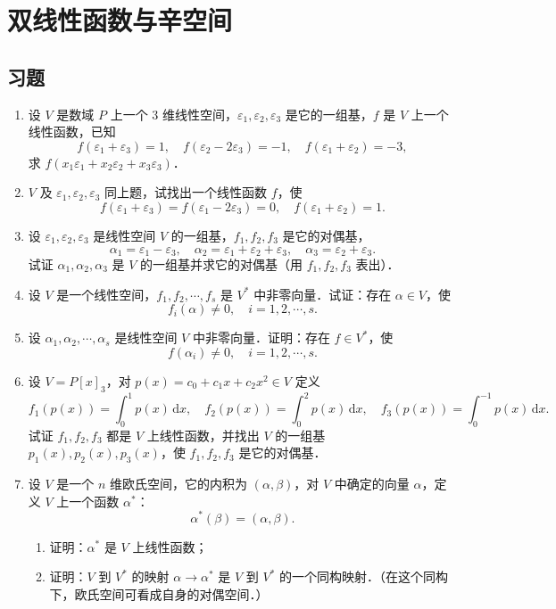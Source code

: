 \chapter{双线性函数与辛空间}
\section{习题}
\begin{enumerate}
  \item 设 $V$ 是数域 $P$ 上一个 3 维线性空间，$\varepsilon_1,\varepsilon_2,\varepsilon_3$ 是它的一组基，$f$ 是 $V$ 上一个线性函数，已知
  \[
    f(\varepsilon_1+\varepsilon_3)=1,\quad f(\varepsilon_2-2\varepsilon_3)=-1,\quad f(\varepsilon_1+\varepsilon_2)=-3,
  \]
  求 $f(x_1\varepsilon_1+x_2\varepsilon_2+x_3\varepsilon_3)$．

  \anscompute
  \item $V$ 及 $\varepsilon_1,\varepsilon_2,\varepsilon_3$ 同上题，试找出一个线性函数 $f$，使
  \[
    f(\varepsilon_1+\varepsilon_3)=f(\varepsilon_1-2\varepsilon_3)=0,\quad f(\varepsilon_1+\varepsilon_2)=1.
  \]

  \ansgeneral
  \item 设 $\varepsilon_1,\varepsilon_2,\varepsilon_3$ 是线性空间 $V$ 的一组基，$f_1,f_2,f_3$ 是它的对偶基，
  \[
    \alpha_1=\varepsilon_1-\varepsilon_3,\quad \alpha_2=\varepsilon_1+\varepsilon_2+\varepsilon_3,\quad \alpha_3=\varepsilon_2+\varepsilon_3.
  \]
  试证 $\alpha_1,\alpha_2,\alpha_3$ 是 $V$ 的一组基并求它的对偶基（用 $f_1,f_2,f_3$ 表出）．

  \ansproof
  \item 设 $V$ 是一个线性空间，$f_1,f_2,\cdots,f_s$ 是 $V^*$ 中非零向量．试证：存在 $\alpha\in V$，使
  \[
    f_i(\alpha)\neq 0,\quad i=1,2,\cdots,s.
  \]

  \ansproof
  \item 设 $\alpha_1,\alpha_2,\cdots,\alpha_s$ 是线性空间 $V$ 中非零向量．证明：存在 $f\in V^*$，使
  \[
    f(\alpha_i)\neq 0,\quad i=1,2,\cdots,s.
  \]

  \ansproof
  \item 设 $V=P[x]_3$，对 $p(x)=c_0+c_1x+c_2x^2\in V$ 定义
  \[
    f_1(p(x))=\int_0^1 p(x)\,\mathrm{d}x,\quad
    f_2(p(x))=\int_0^2 p(x)\,\mathrm{d}x,\quad
    f_3(p(x))=\int_0^{-1} p(x)\,\mathrm{d}x.
  \]
  试证 $f_1,f_2,f_3$ 都是 $V$ 上线性函数，并找出 $V$ 的一组基 $p_1(x),p_2(x),p_3(x)$，使 $f_1,f_2,f_3$ 是它的对偶基．

  \ansproof
  \item 设 $V$ 是一个 $n$ 维欧氏空间，它的内积为 $(\alpha,\beta)$，对 $V$ 中确定的向量 $\alpha$，定义 $V$ 上一个函数 $\alpha^*$：
  \[
    \alpha^*(\beta)=(\alpha,\beta).
  \]
  \begin{enumerate}
    \item 证明：$\alpha^*$ 是 $V$ 上线性函数；
  \anssub
    \item 证明：$V$ 到 $V^*$ 的映射 $\alpha\to\alpha^*$ 是 $V$ 到 $V^*$ 的一个同构映射．（在这个同构下，欧氏空间可看成自身的对偶空间．）
  \anssub
  \end{enumerate}


\end{enumerate}

